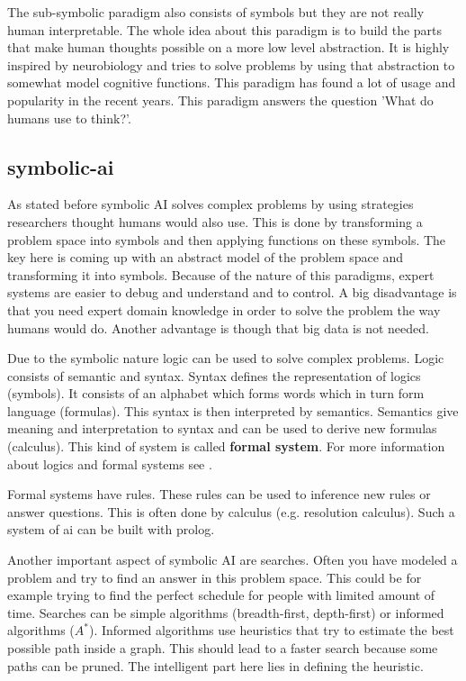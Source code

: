 \documentclass[jou,apacite]{apa6}
\begin{document}
The sub-symbolic paradigm also consists of symbols but they are not really human interpretable. The whole idea about this paradigm is to build the parts that make human thoughts possible on a more low level abstraction. It is highly inspired by neurobiology and tries to solve problems by using that abstraction to somewhat model cognitive functions. This paradigm has found a lot of usage and popularity in the recent years. This paradigm answers the question 'What do humans use to think?'.

\subsection{\gls{symbolic-ai}}
As stated before symbolic AI solves complex problems by using strategies researchers thought humans would also use. This is done by transforming a problem space into symbols and then applying functions on these symbols. The key here is coming up with an abstract model of the problem space and transforming it into symbols. Because of the nature of this paradigms, expert systems are easier to debug and understand and to control. A big disadvantage is that you need expert domain knowledge in order to solve the problem the way humans would do. Another advantage is though that big data is not needed.

Due to the symbolic nature logic can be used to solve complex problems. Logic consists of semantic and syntax. Syntax defines the representation of logics (symbols). It consists of an alphabet which forms words which in turn form language (formulas). This syntax is then interpreted by semantics. Semantics give meaning and interpretation to syntax and can be used to derive new formulas (calculus). This kind of system is called \textbf{formal system}. For more information about logics and formal systems see \cite{Richardson2006}. 

Formal systems have rules. These rules can be used to inference new rules or answer questions. This is often done by calculus (e.g. resolution calculus). Such a system of \gls{ai} can be built with \gls{prolog}.

Another important aspect of symbolic AI are searches. Often you have modeled a problem and try to find an answer in this problem space. This could be for example trying to find the perfect schedule for people with limited amount of time. Searches can be simple algorithms (breadth-first, depth-first) or informed algorithms ($A^*$). Informed algorithms use heuristics that try to estimate the best possible path inside a graph. This should lead to a faster search because some paths can be pruned. The intelligent part here lies in defining the heuristic.
\end{document}
